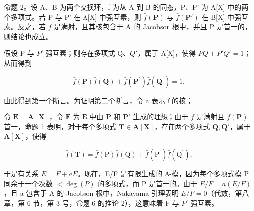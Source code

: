 命题 2。设 A、B 为两个交换环，f 为从 A 到 B 的同态，P、P' 为 A{[}X{]} 中的两个多项式。若 P 与 P' 在 A{[}X{]} 中强互素，则 \(\bar{f}(\mathbf{P})\) 与 \(\bar{f}(\mathbf{P}')\) 在 B{[}X{]} 中强互素。反之，若 \(f\) 是满射，且其核包含于 A 的 Jacobson 根中，并且 P 是首一的，则结论也成立。

假设 P 与 \(P'\) 强互素；则存在多项式 Q、\(Q'\)，属于 A{[}X{]}，使得 \(PQ + P'Q' = 1\)；从而得到

\[
\bar {f} (\mathbf {P}) \bar {f} (\mathbf {Q}) + \bar {f} (\mathbf {P} ^ {\prime}) \bar {f} (\mathbf {Q} ^ {\prime}) = 1,
\]

由此得到第一个断言。为证明第二个断言，令 a 表示 f 的核；

令 \(\mathbf{E} = \mathbf{A}[\mathbf{X}]\)，令 \(\mathbf{F}\) 为 \(\mathbf{E}\) 中由 \(\mathbf{P}\) 和 \(\mathbf{P}'\) 生成的理想；由于 \(f\) 是满射且 \(\bar{f}(\mathbf{P})\) 首一，命题 1 表明，对于每个多项式 \(\mathbf{T} \in \mathbf{A}[\mathbf{X}]\)，存在两个多项式 \(\mathbf{Q}, \mathbf{Q}'\)，属于 \(\mathbf{A}[\mathbf{X}]\)，使得

\[
\bar {f} (\mathrm{T}) = \bar {f} (\mathrm{P}) \bar {f} (\mathrm{Q}) + \bar {f} (\mathrm{P} ^ {\prime}) \bar {f} (\mathrm{Q} ^ {\prime}),
\]

于是有关系 \(E = F + aE\)。现在，E/F 是有限生成的 A-模，因为每个多项式模 P 同余于一个次数 \(<\deg(P)\) 的多项式，而 P 是首一的。由于 \(E/F = a(E/F)\)，且 a 包含于 A 的 Jacobson 根中，Nakayama 引理表明 \(E/F = 0\)（代数，第八章，第 6 节，第 3 号，命题 6 的推论 2），这意味着 P 与 \(P'\) 强互素。

